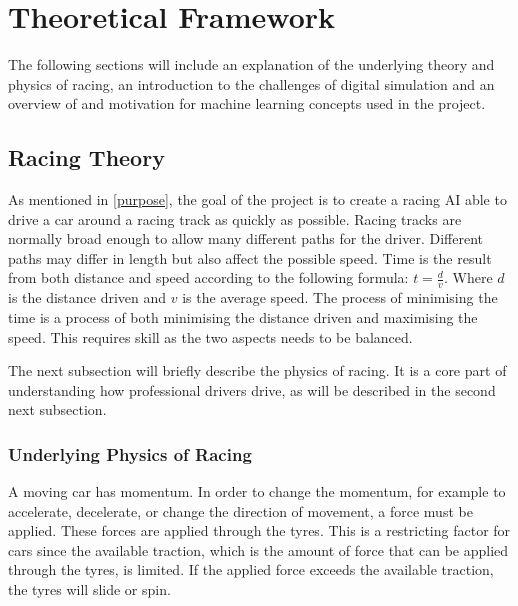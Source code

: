 \chapter{Theoretical Framework}


The following sections will include an explanation of the underlying theory and physics of racing, an introduction to the challenges of digital simulation and an overview of and motivation for machine learning concepts used in the project. 

\section{Racing Theory}
\label{racing_theory}

As mentioned in \ref{purpose}, the goal of the project is to create a racing AI able to drive a car around a racing track as quickly as possible. Racing tracks are normally broad enough to allow many different paths for the driver. Different paths may differ in length but also affect the possible speed. Time is the result from both distance and speed according to the following formula: \(t = \frac{d}{v}\). Where $d$ is the distance driven and $v$ is the average speed. The process of minimising the time is a process of both minimising the distance driven and maximising the speed. This requires skill as the two aspects needs to be balanced.



The next subsection will briefly describe the physics of racing. It is a core part of understanding how professional drivers drive, as will be described in the second next subsection.

\subsection{Underlying Physics of Racing}
A moving car has momentum. In order to change the momentum, for example to accelerate, decelerate, or change the direction of movement, a force must be applied. These forces are applied through the tyres. This is a restricting factor for cars since the available traction, which is the amount of force that can be applied through the tyres, is limited. If the applied force exceeds the available traction, the tyres will slide or spin. 

